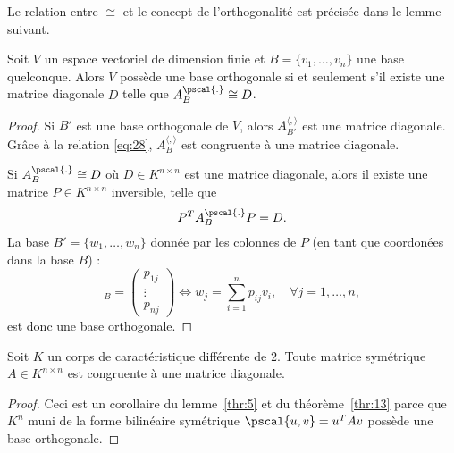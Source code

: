 Le relation entre $\cong$ et le concept de l'orthogonalité   est précisée dans le lemme suivant. 
\begin{lemma}
\label{thr:13}
  Soit $V$ un espace vectoriel de dimension finie et $B = \{v_1,\dots,v_n\}$ une base quelconque. Alors $V$ possède une base orthogonale si et seulement s'il existe une matrice diagonale $D$ 
telle que 
 $A_B^{\pscal{.}} \cong D$. 
\end{lemma}
\begin{proof}
Si $B'$ est une base orthogonale de $V$, alors $A_{B'}^{〈,〉}$ est une matrice diagonale. Grâce à la relation \eqref{eq:28}, $A_{B}^{〈,〉}$ est congruente à une matrice diagonale. 


Si $A_B^{\pscal{.}} \cong D$ où $D ∈ K^{n×n}$ est une matrice diagonale, alors 
il existe une matrice $P ∈K^{n ×n}$ inversible, telle que 
\begin{displaymath}
  P^T A_B^{\pscal{.}} P = D. 
\end{displaymath}
La base  $B' = \{w_1,\dots,w_n\}$ donnée par les colonnes de $P$ (en tant que coordonées dans la base $B$) :
  \begin{displaymath}
     [w_j]_B =
  \begin{pmatrix}
    p_{1j}\\ \vdots \\ p_{nj} 
  \end{pmatrix} \iff w_j = \sum_{i=1}^n p_{ij} v_i, \quad \forall j=1, \dots, n,
  \end{displaymath}
 est donc une base orthogonale. 
\end{proof}




 

\begin{corollary}
  \label{co:4}
  Soit $K$ un corps de caractéristique différente de $2$. Toute matrice symétrique  $A \in K^{n \times n}$ est congruente à une matrice diagonale. 
\end{corollary}
\begin{proof}
Ceci est un corollaire du  lemme~\ref{thr:5} et du théorème~\ref{thr:13} 
parce que  $K^n$ muni de la forme bilinéaire symétrique $\pscal{u,v} = u^TAv$ possède une base orthogonale. 
\end{proof}






